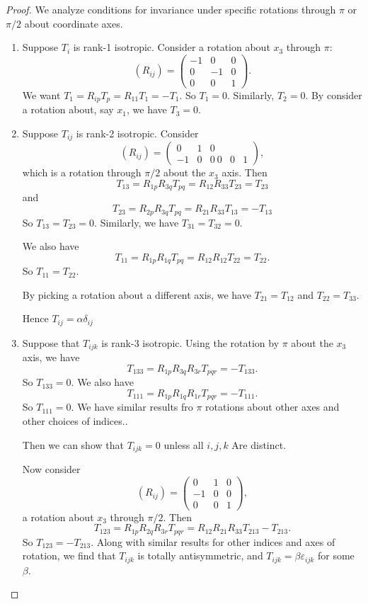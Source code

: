 \documentclass[a4paper]{article}
\begin{document}
\begin{proof}
  We analyze conditions for invariance under specific rotations through $\pi$ or $\pi/2$ about coordinate axes.

  \begin{enumerate}
    \item Suppose $T_i$ is rank-1 isotropic. Consider a rotation about $x_3$ through $\pi$:
      \[
        (R_{ij}) = 
        \begin{pmatrix}
          -1 & 0 & 0\\
          0 & -1 & 0\\
          0 & 0 & 1
        \end{pmatrix}.
      \]
      We want $T_1 = R_{ip}T_p = R_{11} T_1 = -T_1$. So $T_1 = 0$. Similarly, $T_2 = 0$. By consider a rotation about, say $x_1$, we have $T_3 = 0$.
    \item Suppose $T_{ij}$ is rank-2 isotropic. Consider
      \[
        (R_{ij}) = 
        \begin{pmatrix}
          0 & 1 & 0\\
          -1 & 0 & 0\
          0 & 0 & 1
        \end{pmatrix},
      \]
      which is a rotation through $\pi/2$ about the $x_3$ axis. Then
      \[
        T_{13} = R_{1p}R_{3q} T_{pq} = R_{12}R_{33}T_{23} = T_{23}
      \]
      and
      \[
        T_{23} = R_{2p}R_{3q} T_{pq} = R_{21}R_{33}T_{13} = -T_{13}
      \]
      So $T_{13} = T_{23} = 0$. Similarly, we have $T_{31} = T_{32} = 0$.

      We also have
      \[
        T_{11} = R_{1p} R_{1q} T_{pq} = R_{12} R_{12}T_{22} = T_{22}.
      \]
      So $T_{11} = T_{22}$.

      By picking a rotation about a different axis, we have $T_{21} = T_{12}$ and $T_{22} = T_{33}$.

      Hence $T_{ij} = \alpha \delta_{ij}$

    \item Suppose that $T_{ijk}$ is rank-3 isotropic. Using the rotation by $\pi$ about the $x_3$ axis, we have
      \[
        T_{133} = R_{1p}R_{3q}R_{3r}T_{pqr} = -T_{133}.
      \]
      So $T_{133} = 0$. We also have
      \[
        T_{111} = R_{1p}R_{1q}R_{1r}T_{pqr} = -T_{111}.
      \]
      So $T_{111} = 0$. We have similar results fro $\pi$ rotations about other axes and other choices of indices..

      Then we can show that $T_{ijk} = 0$ unless all $i, j, k$ Are distinct.

      Now consider
      \[
        (R_{ij}) = 
        \begin{pmatrix}
          0 & 1 & 0\\
          -1 & 0 & 0\\
          0 & 0 & 1
        \end{pmatrix},
      \]
      a rotation about $x_3$ through $\pi/2$. Then
      \[
        T_{123} = R_{1p}R_{2q}R_{3r}T_{pqr} = R_{12}R_{21}R_{33}T_{213} -T_{213}.
      \]
      So $T_{123} = -T_{213}$. Along with similar results for other indices and axes of rotation, we find that $T_{ijk}$ is totally antisymmetric, and $T_{ijk} = \beta \varepsilon_{ijk}$ for some $\beta$.
  \end{enumerate}
\end{proof}
\end{document}
